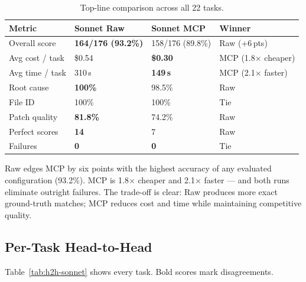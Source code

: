 \begin{table}[h]
\centering
\caption{Top-line comparison across all 22 tasks.}\label{tab:exec-summary-sonnet}
\begin{tabular}{llll}
\toprule
\textbf{Metric} & \textbf{Sonnet Raw} & \textbf{Sonnet MCP} & \textbf{Winner} \\
\midrule
Overall score      & \textbf{164/176 (93.2\%)} & 158/176 (89.8\%) & Raw (+6\,pts) \\
Avg cost / task    & \$0.54            & \textbf{\$0.30}            & MCP (1.8$\times$ cheaper) \\
Avg time / task    & 310\,s            & \textbf{149\,s}            & MCP (2.1$\times$ faster) \\
Root cause         & \textbf{100\%}    & 98.5\%                     & Raw \\
File ID            & 100\%             & 100\%                      & Tie \\
Patch quality      & \textbf{81.8\%}   & 74.2\%                     & Raw \\
Perfect scores     & \textbf{14}       & 7                          & Raw \\
Failures           & \textbf{0}        & \textbf{0}                 & Tie \\
\bottomrule
\end{tabular}
\end{table}

\noindent
Raw edges MCP by six points with the highest accuracy of any evaluated
configuration (93.2\%).
MCP is 1.8$\times$ cheaper and 2.1$\times$ faster --- and both runs
eliminate outright failures.
The trade-off is clear: Raw produces more exact ground-truth matches;
MCP reduces cost and time while maintaining competitive quality.

\subsection{Per-Task Head-to-Head}\label{sec:h2h-sonnet}

Table~\ref{tab:h2h-sonnet} shows every task.
Bold scores mark disagreements.


